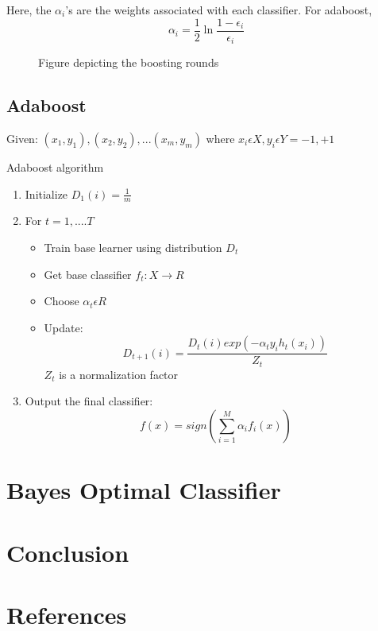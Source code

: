 \documentclass{acmtog} %
\begin{document}
Here, the $\alpha _i$'s are the weights associated with each classifier. For adaboost, 
\begin{equation}
	\alpha _i = \frac{1}{2} \ln{\frac{1 - \epsilon _i}{\epsilon _i}}
\label{eq:boostingAlphaEq}
\end{equation}

\begin{figure}
	\centering
	\def\svgwidth{\columnwidth}
	
	\caption{Figure depicting the boosting rounds}
\end{figure}

\subsection{Adaboost}
Given: $(x_1, y_1), (x_2, y_2),...(x_m, y_m)$ where $x_i \epsilon X, y_i \epsilon Y = {-1, +1}$ 
\begin{algorithm}
	\caption{Adaboost algorithm}
	\begin{enumerate}
		\item Initialize $D_1(i) = \frac{1}{m}$
		\item For $t = 1, .... T$
			\begin{itemize}
				\item Train base learner using distribution $D_t$
				\item Get base classifier $f_t : X \longrightarrow R$
				\item Choose $\alpha _t \epsilon R$
				\item Update: 
					\begin{equation}
						D_{t+1}(i) = \frac{D_t(i) exp(-\alpha _t y_i h_t(x_i))}{Z_t}
					\end{equation}
					$Z_t$ is a normalization factor 
			\end{itemize}
		\item Output the final classifier:
			\begin{equation}
				f(x) = sign(\sum^M_{i=1} \alpha _i f_i(x))
				\label{eq:boostingEq}
			\end{equation}
	\end{enumerate}
\end{algorithm}
\section{Bayes Optimal Classifier}
\section{Conclusion}
\section{References}



\end{document}
